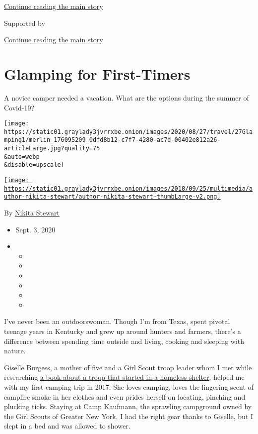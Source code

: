 \protect\hyperlink{after-top}{Continue reading the main story}

Supported by

\protect\hyperlink{after-sponsor}{Continue reading the main story}

\hypertarget{glamping-for-first-timers}{%
\section{Glamping for First-Timers}\label{glamping-for-first-timers}}

A novice camper needed a vacation. What are the options during the
summer of Covid-19?

\texttt{[image: https://static01.graylady3jvrrxbe.onion/images/2020/08/27/travel/27Glamping1/merlin\_176095209\_0dfd8b12-c7f7-4280-ac7d-00402e812a26-articleLarge.jpg?quality=75\\\&auto=webp\\\&disable=upscale]}

\href{https://www.nytimes3xbfgragh.onion/by/nikita-stewart}{\texttt{[image: https://static01.graylady3jvrrxbe.onion/images/2018/09/25/multimedia/author-nikita-stewart/author-nikita-stewart-thumbLarge-v2.png]}}

By \href{https://www.nytimes3xbfgragh.onion/by/nikita-stewart}{Nikita
Stewart}

\begin{itemize}
\item
  Sept. 3, 2020
\item
  \begin{itemize}
  \item
  \item
  \item
  \item
  \item
  \item
  \end{itemize}
\end{itemize}

I've never been an outdoorswoman. Though I'm from Texas, spent pivotal
teenage years in Kentucky and grew up around hunters and farmers,
there's a difference between spending time outside and living, cooking
and sleeping with nature.

Giselle Burgess, a mother of five and a Girl Scout troop leader whom I
met while researching
\href{https://www.nytimes3xbfgragh.onion/2020/05/19/books/review/troop-6000-nikita-stewart.html}{a
book about a troop that started in a homeless shelter}, helped me with
my first camping trip in 2017. She loves camping, loves the lingering
scent of campfire smoke in her clothes and even prides herself on
locating, pinching and plucking ticks. Staying at Camp Kaufmann, the
sprawling campground owned by the Girl Scouts of Greater New York, I had
the right gear thanks to Giselle, but I slept in a bed and was allowed
to shower.

